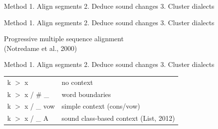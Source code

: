 \documentclass[xcolor={dvipsnames}]{beamer}
\begin{document}
\begin{frame}[t]{Method}{}
{ 1.} Align segments \hspace{0.5em} { 2.} Deduce sound changes \hspace{0.5em} { 3.} Cluster dialects
\end{frame}

\newcommand\tabnode[1]{\addtocounter{nodecount}{1} \tikz \node  (\arabic{nodecount}) {#1};}

\begin{frame}[t]{Method}{}
{ 1.} Align segments \hspace{0.5em} { { 2.} Deduce sound changes \hspace{0.5em} { 3.} Cluster dialects}

\vspace{2em}


\vspace{1em}
Progressive multiple sequence alignment\\(Notredame et al., 2000)
\end{frame}


\begin{frame}[t]{Method}{}
{ { 1.} Align segments} \hspace{0.5em} { 2.} Deduce sound changes \hspace{0.5em} { { 3.} Cluster dialects}

\vspace{2em}


\pause
\vspace{1em}
\begin{tabular}{ll}
k $>$ x & no context \\
k $>$ x / \# \_ & word boundaries \\
k $>$ x / \_ vow &  simple context (cons/vow)\\
k $>$ x / \_ A & sound class-based context (List, 2012)
\end{tabular}
\end{frame}
\end{document}
